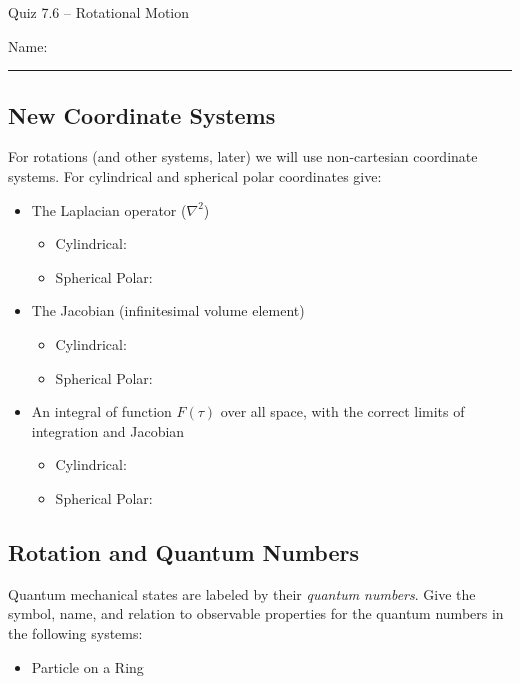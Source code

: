 \documentclass[11pt, letterpaper]{memoir}
\begin{document}
\begin{center}
	{\large Quiz 7.6 --	Rotational Motion}
\end{center}
{\large Name: \rule[-1mm]{4in}{.1pt}

\subsection*{New Coordinate Systems}
For rotations (and other systems, later) we will use non-cartesian coordinate systems. For cylindrical and spherical polar coordinates give:
\begin{itemize}
	\item The Laplacian operator ($\nabla^2$)
	      \begin{itemize}
		      \item Cylindrical:

		            \vspace{2em}
		      \item Spherical Polar:
	      \end{itemize}

	      \vspace{2em}
	\item The Jacobian (infinitesimal volume element)
	      \begin{itemize}
		      \item Cylindrical:

		            \vspace{2em}
		      \item Spherical Polar:
	      \end{itemize}

	      \vspace{2em}
	\item An integral of function $F(\tau)$ over all space, with the correct limits of integration and Jacobian
	      \begin{itemize}
		      \item Cylindrical:

		            \vspace{2em}
		      \item Spherical Polar:
	      \end{itemize}
\end{itemize}

\vspace{2em}

\subsection*{Rotation and Quantum Numbers}
Quantum mechanical states are labeled by their \emph{quantum numbers}. Give the symbol, name, and relation to observable properties for the quantum numbers in the following systems:
\begin{itemize}
	\item Particle on a Ring


\end{itemize}}
\end{document}
